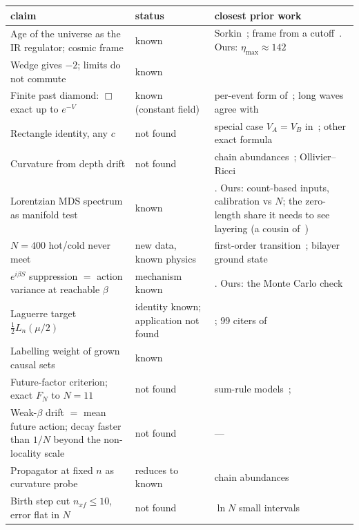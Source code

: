\documentclass[11pt,a4paper]{article}
\begin{document}
\begin{table}[t]
\centering\small
\begin{tabular}{@{}>{\raggedright}p{}>{\raggedright}p{}>{\raggedright\arraybackslash}p{}@{}}
\toprule
claim & status & closest prior work\\
\midrule
Age of the universe as the IR regulator; cosmic frame & known & Sorkin~\cite{Sorkin07}; frame from a cutoff~\cite{BK26}. Ours: $\eta_{\max}\approx142$\\
Wedge gives $-2$; limits do not commute & known & \cite{BK25}\\
Finite past diamond: $\Box$ exact up to $e^{-V}$ & known (constant field) & per-event form of~\cite{BDJS15}; long waves agree with~\cite{ASS14}\\
Rectangle identity, any $c$ & not found & special case $V_A=V_B$ in~\cite{BK24}; other exact formula~\cite{HMM25}\\
Curvature from depth drift & not found & chain abundances~\cite{RSS13}; Ollivier--Ricci~\cite{BBR26}\\
Lorentzian MDS spectrum as manifold test & known & \cite{CloughEvans16}. Ours: count-based inputs, calibration vs $N$; the zero-length share it needs to see layering (a cousin of~\cite{GlaserSurya13})\\
$N=400$ hot/cold never meet & new data, known physics & first-order transition~\cite{GOS18}; bilayer ground state~\cite{CunninghamSurya19}\\
$e^{i\beta S}$ suppression $=$ action variance at reachable $\beta$ & mechanism known & \cite{LoomisCarlip18,CCS23}. Ours: the Monte Carlo check\\
Laguerre target $\tfrac12L_n(\mu/2)$ & identity known; application not found & \cite{LifschitzPittel81,Pinsky06}; 99 citers of~\cite{Johnston08,Johnston09}\\
Labelling weight of grown causal sets & known & \cite[§6.4]{Surya19}\\
Future-factor criterion; exact $F_N$ to $N=11$ & not found & sum-rule models~\cite{DJS10,SuryaZalel20}; \cite{Sorkin11}\\
Weak-$\beta$ drift $=$ mean future action; decay faster than $1/N$ beyond the non-locality scale & not found & ---\\
Propagator at fixed $n$ as curvature probe & reduces to known & chain abundances~\cite{RSS13}\\
Birth step cut $n_{xf}\le10$, error flat in $N$ & not found & $\ln N$ small intervals~\cite{GlaserSurya13}\\

\end{tabular}
\end{table}
\end{document}
